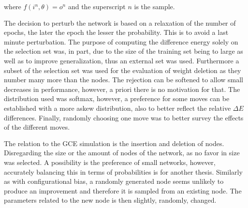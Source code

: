 where $f(i^n, \theta)= o^n$ and the superscript $n$ is the sample.

The decision to perturb the network is based on a relaxation of the number of epochs, the later the epoch the lesser the probability. This is to avoid a last minute perturbation. The purpose of computing the difference energy solely on the selection set was, in part, due to the size of the training set being to large as well as to improve generalization, thus an external set was used. Furthermore a subset of the selection set was used for the evaluation of weight deletion as they number many more than the nodes. The rejection can be softened to allow small decreases in performance, however, a priori there is no motivation for that. The distribution used was softmax, however, a preference for some moves can be established with a more askew distribution, also to better reflect the relative $\Delta E$ differences. Finally, randomly choosing one move was to better survey the effects of the different moves. 

The relation to the GCE simulation is the insertion and deletion of nodes. Disregarding the size or the amount of nodes of the network, as no favor in size was selected. A possibility is the preference of small networks, however, accurately balancing this in terms of probabilities is for another thesis. Similarly as with configurational bias, a randomly generated node seems unlikely to produce an improvement and therefore it is sampled from an existing node. The parameters related to the new node is then slightly, randomly, changed. 